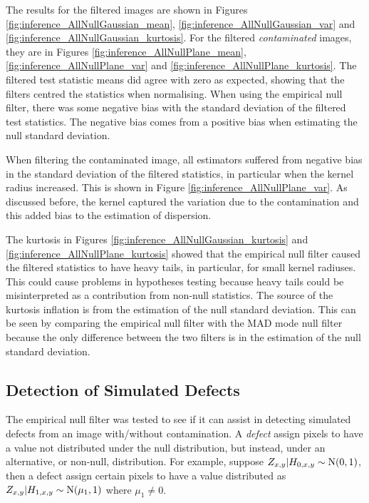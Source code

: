 The results for the filtered images are shown in Figures \ref{fig:inference_AllNullGaussian_mean}, \ref{fig:inference_AllNullGaussian_var} and \ref{fig:inference_AllNullGaussian_kurtosis}. For the filtered \emph{contaminated} images, they are in Figures \ref{fig:inference_AllNullPlane_mean}, \ref{fig:inference_AllNullPlane_var} and \ref{fig:inference_AllNullPlane_kurtosis}. The filtered test statistic means did agree with zero as expected, showing that the filters centred the statistics when normalising. When using the empirical null filter, there was some negative bias with the standard deviation of the filtered test statistics. The negative bias comes from a positive bias when estimating the null standard deviation.

When filtering the contaminated image, all estimators suffered from negative bias in the standard deviation of the filtered statistics, in particular when the kernel radius increased. This is shown in Figure \ref{fig:inference_AllNullPlane_var}. As discussed before, the kernel captured the variation due to the contamination and this added bias to the estimation of dispersion.

The kurtosis in Figures \ref{fig:inference_AllNullGaussian_kurtosis} and \ref{fig:inference_AllNullPlane_kurtosis} showed that the empirical null filter caused the filtered statistics to have heavy tails, in particular, for small kernel radiuses. This could cause problems in hypotheses testing because heavy tails could be misinterpreted as a contribution from non-null statistics. The source of the kurtosis inflation is from the estimation of the null standard deviation. This can be seen by comparing the empirical null filter with the MAD mode null filter because the only difference between the two filters is in the estimation of the null standard deviation.

\afterpage{\clearpage}
\subsection{Detection of Simulated Defects}

The empirical null filter was tested to see if it can assist in detecting simulated defects from an image with/without contamination. A \emph{defect} assign pixels to have a value not distributed under the null distribution, but instead, under an alternative, or non-null, distribution. For example, suppose $Z_{x,y}|H_{0,x,y}\sim\operatorname{N}(0,1)$, then a defect assign certain pixels to have a value distributed as $Z_{x,y}|H_{1,x,y}\sim\operatorname{N}(\mu_{1},1)$ where $\mu_1\neq0$.

